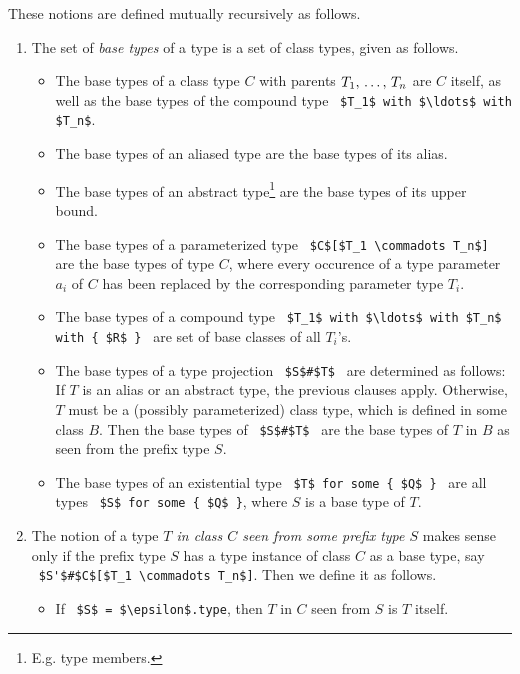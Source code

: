 These notions are defined mutually recursively as follows. 

\begin{enumerate}
  \item  The set of {\em base types} of a type is a set of class types, given as follows.
    \begin{itemize}
      \item The base types of a class type $C$ with parents $T_1 ,\, \ldots ,\, T_n$ are $C$ itself, as well as the base types of the compound type ~\lstinline!$T_1$ with $\ldots$ with $T_n$!. 

      \item The base types of an aliased type are the base types of its alias. 

      \item The base types of an abstract type\footnote{E.g. type members.} are the base types of its upper bound. 

      \item The base types of a parameterized type ~\lstinline!$C$[$T_1 \commadots T_n$]!~ are the base types of type $C$, where every occurence of a type parameter $a_i$ of $C$ has been replaced by the corresponding parameter type $T_i$. 

      \item The base types of a compound type ~\lstinline!$T_1$ with $\ldots$ with $T_n$ with { $R$ }!~ are set of base classes of all $T_i$'s. 

      \item The base types of a type projection ~\lstinline!$S$#$T$!~ are determined as follows: If $T$ is an alias or an abstract type, the previous clauses apply. Otherwise, $T$ must be a (possibly parameterized) class type, which is defined in some class $B$. Then the base types of ~\lstinline!$S$#$T$!~ are the base types of $T$ in $B$ as seen from the prefix type $S$. 

      \item The base types of an existential type ~\lstinline!$T$ for some { $Q$ }!~ are all types ~\lstinline!$S$ for some { $Q$ }!, where $S$ is a base type of $T$. 
    \end{itemize}

  \item The notion of a type {\em $T$ in class $C$ seen from some prefix type $S$} makes sense only if the prefix type $S$ has a type instance of class $C$ as a base type, say ~\lstinline!$S'$#$C$[$T_1 \commadots T_n$]!. Then we define it as follows.
    \begin{itemize}
      \item If ~\lstinline!$S$ = $\epsilon$.type!, then $T$ in $C$ seen from $S$ is $T$ itself. 


\end{itemize}
\end{enumerate}
